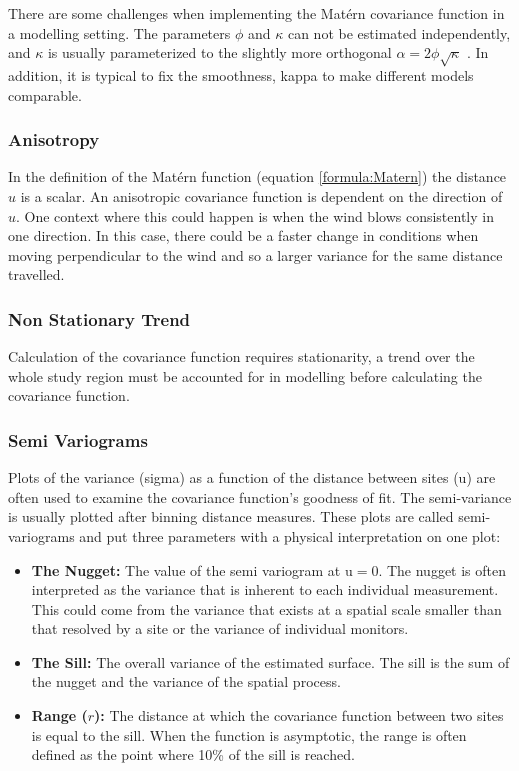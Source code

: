 There are some challenges when implementing the Mat\'{e}rn covariance function in a modelling setting.  The parameters $\phi$ and $\kappa$ can not be estimated independently, and $\kappa$ is usually parameterized to the slightly more orthogonal $\alpha = 2\phi \sqrt{\kappa}$  \citep{diggle:07}.  In addition, it is typical to fix the smoothness, \gls{kappa} to make different models comparable. 

\subsubsection*{Anisotropy}
\label{subsubsec:anisotropy}
In the definition of the Mat\'{e}rn function (equation \ref{formula:Matern}) the distance $u$ is a scalar.  An anisotropic covariance function is dependent on the direction of $u$.  One context where this could happen is when the wind blows consistently in one direction.  In this case, there could be a faster change in conditions when moving perpendicular to the wind and so a larger variance for the same distance travelled.  

\subsubsection*{Non Stationary Trend}\label{subsubsec:nonstatiomary}
Calculation of the covariance function requires stationarity, a trend over the whole study region must be accounted for in modelling before calculating the covariance function.

\subsubsection*{Semi Variograms}
\label{subsubsec:semivariograms}
Plots of the variance (\gls{sigma}) as a function of the distance between sites (\gls{u}) are often used to examine the covariance function's goodness of fit. The semi-variance is usually plotted after binning distance measures. These plots are called semi-variograms and put three parameters with a physical interpretation on one plot:

\begin{itemize}
	\item \textbf{The Nugget:} The value of the semi variogram at \gls{u}$=0$.  The nugget is often interpreted as the variance that is inherent to each individual measurement.  This could come from the variance that exists at a spatial scale smaller than that resolved by a site or the variance of individual monitors.
	\item  \textbf{The Sill:} The overall variance of the estimated surface.  The sill is the sum of the nugget and the variance of the spatial process.
	\item \textbf{Range ($r$):} The distance at which the covariance function between two sites is equal to the sill.  When the function is asymptotic, the range is often defined as the point where 10\% of the sill is reached.  
\end{itemize}

